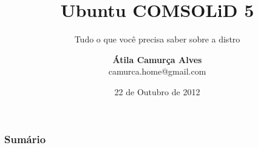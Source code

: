 \documentclass[10pt]{beamer}
\begin{document}
\title{Ubuntu COMSOLiD 5}
\subtitle{Tudo o que você precisa saber sobre a distro}
\author{\textbf{Átila Camurça Alves} \\ camurca.home@gmail.com}
\date{22 de Outubro de 2012}
\begin{frame}
\titlepage
\end{frame}

\begin{frame}\frametitle{Sumário}
\tableofcontents
\end{frame}


\end{document}
